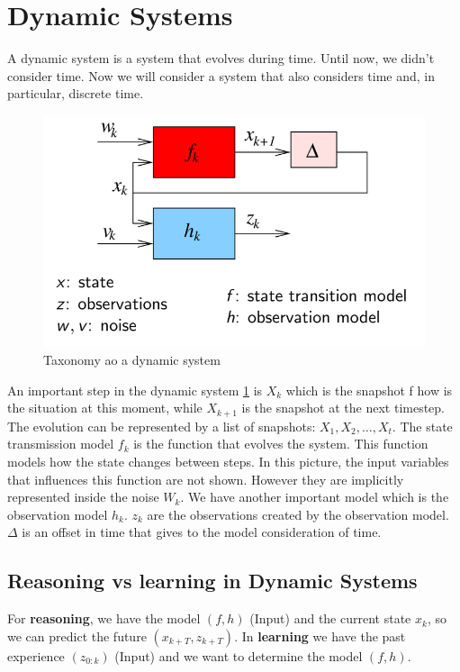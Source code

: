 \section{Dynamic Systems}

A dynamic system is a system that evolves during time. Until now, we didn't consider time. Now we will consider a system that also considers time and, in particular, discrete time.

\begin{figure}[H]
    \centering
    \includegraphics[width=12cm]{images/Reinforcement Learning/dynam_sys.png}
    \caption{Taxonomy ao a dynamic system}
    \label{fig:dyn_sys}
\end{figure}

An important step in the dynamic system \ref{fig:dyn_sys} is $X_{k}$ which is the snapshot f how is the situation at this moment, while $X_{k + 1}$ is the snapshot at the next timestep. The evolution can be represented by a list of snapshots: $X_{1}, X_{2}, \dots, X_{t}$. The state transmission model $f_{k}$ is the function that evolves the system. This function models how the state changes between steps. In this picture, the input variables that influences this function are not shown. However they are implicitly represented inside the noise $W_{k}$. We have another important model which is the observation model $h_{k}$. $z_{k}$ are the observations created by the observation model. $\Delta$ is an offset in time that gives to the model consideration of time.

\subsection{Reasoning vs learning in Dynamic Systems}
For \textbf{reasoning}, we have the model $(f, h)$ (Input) and the current state $x_{k}$, so we can predict the future $(x_{k + T}, z_{k + T})$. In \textbf{learning} we have the past experience $(z_{0:k})$ (Input) and we want to determine the model $(f, h)$.

